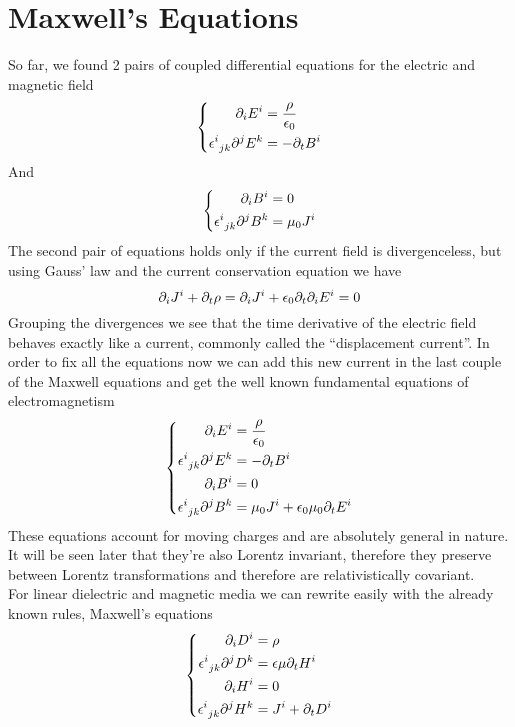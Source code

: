 \documentclass[../electromagnetism]{subfiles}
\begin{document}
\section{Maxwell's Equations}
So far, we found 2 pairs of coupled differential equations for the electric and magnetic field
\begin{equation}
	\left\{ \begin{aligned}
			\partial_iE^i&=\frac{\rho}{\epsilon_0}\\
			\epsilon^{i}_{\ jk}\partial^jE^k&=-\partial_{t}B^i
	\end{aligned}\right.
	\label{eq:mwcouple1}
\end{equation}
And
\begin{equation}
	\left\{ \begin{aligned}
		\partial_iB^i&=0\\
		\epsilon^{i}_{\ jk}\partial^jB^k&=\mu_0J^i
	\end{aligned}\right.
	\label{eq:mwcouple2}
\end{equation}
The second pair of equations holds only if the current field is divergenceless, but using Gauss' law and the current conservation equation we have
\begin{equation}
	\partial_iJ^i+\partial_t\rho=\partial_iJ^i+\epsilon_0\partial_t\partial_iE^i=0
	\label{eq:cf+cc}
\end{equation}
Grouping the divergences we see that the time derivative of the electric field behaves exactly like a current, commonly called the ``displacement current''. In order to fix all the equations now we can add this new current in the last couple of the Maxwell equations and get the well known fundamental equations of electromagnetism
\begin{equation}
	\left\{\begin{aligned}
		\partial_iE^i&=\frac{\rho}{\epsilon_0}\\
		\epsilon^{i}_{\ jk}\partial^jE^k&=-\partial_tB^i\\
		\partial_iB^i&=0\\
		\epsilon^{i}_{\ jk}\partial^jB^k&=\mu_0J^i+\epsilon_0\mu_0\partial_tE^i
	\end{aligned}\right.
	\label{eq:maxwellequationsfull}
\end{equation}
These equations account for moving charges and are absolutely general in nature. It will be seen later that they're also Lorentz invariant, therefore they preserve between Lorentz transformations and therefore are relativistically covariant.\\
For linear dielectric and magnetic media we can rewrite easily with the already known rules, Maxwell's equations
\begin{equation}
	\left\{\begin{aligned}
			\partial_iD^i&=\rho\\
			\epsilon^{i}_{\ jk}\partial^jD^k&=\epsilon\mu\partial_tH^i\\
			\partial_iH^i&=0\\
			\epsilon^{i}_{\ jk}\partial^jH^k&=J^i+\partial_tD^i
	\end{aligned}\right.
	\label{eq:maxwellfulllinearmedia}
\end{equation}
\end{document}
